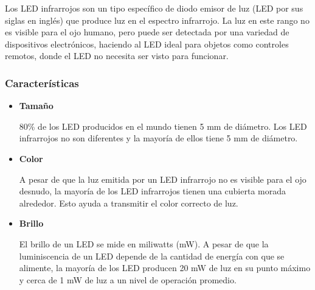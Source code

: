 \documentclass[12pt, fleqn]{article}                            %
\theoremstyle{break}                                            %
\begin{document}
            Los LED infrarrojos son un tipo específico de diodo emisor de luz
            (LED por sus siglas en inglés) que produce luz en el espectro infrarrojo.
            La luz en este rango no es visible para el ojo humano, pero puede ser
            detectada por una variedad de dispositivos electrónicos, haciendo al LED
            ideal para objetos como controles remotos, donde el LED no necesita ser
            visto para funcionar.

            

        \vspace{2em}
        \subsubsection{Características}

            \begin{itemize}
                \item 
                    \textbf{Tamaño}

                    80\% de los LED producidos en el mundo tienen 5 mm de diámetro.
                    Los LED infrarrojos no son diferentes y la mayoría de ellos tiene
                    5 mm de diámetro.

                \item 
                    \textbf{Color}

                    A pesar de que la luz emitida por un LED infrarrojo no es visible
                    para el ojo desnudo, la mayoría de los LED infrarrojos tienen una
                    cubierta morada alrededor. Esto ayuda a transmitir el color correcto
                    de luz.

                \item
                    \textbf{Brillo}

                    El brillo de un LED se mide en miliwatts (mW). A pesar de que la
                    luminiscencia de un LED depende de la cantidad de energía con que
                    se alimente, la mayoría de los LED producen 20 mW de luz en su
                    punto máximo y cerca de 1 mW de luz a un nivel de operación promedio.

            \end{itemize}
\end{document}
